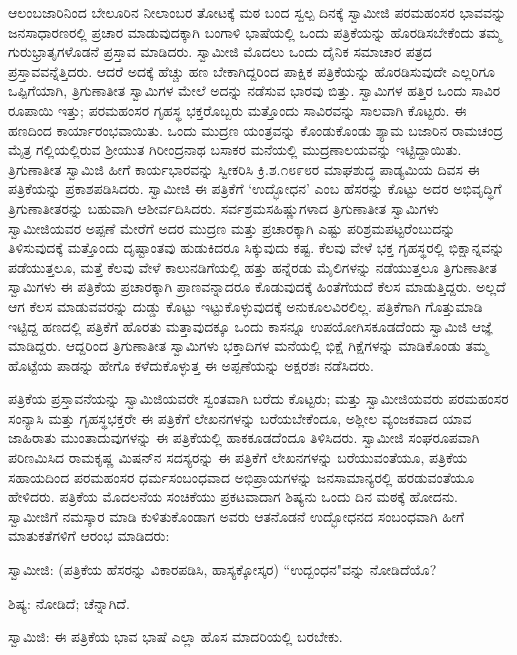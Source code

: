 ಆಲಂಬಜಾರಿನಿಂದ ಬೇಲೂರಿನ ನೀಲಾಂಬರ ತೋಟಕ್ಕೆ ಮಠ ಬಂದ ಸ್ವಲ್ಪ ದಿನಕ್ಕೆ ಸ್ವಾಮೀಜಿ ಪರಮಹಂಸರ ಭಾವವನ್ನು ಜನಸಾಧಾರಣರಲ್ಲಿ ಪ್ರಚಾರ ಮಾಡುವುದಕ್ಕಾಗಿ ಬಂಗಾಳಿ ಭಾಷೆಯಲ್ಲಿ ಒಂದು ಪತ್ರಿಕೆಯನ್ನು ಹೊರಡಿಸಬೇಕೆಂದು ತಮ್ಮ ಗುರುಭ್ರಾತೃಗಳೊಡನೆ ಪ್ರಸ್ತಾವ ಮಾಡಿದರು. ಸ್ವಾಮೀಜಿ ಮೊದಲು ಒಂದು ದೈನಿಕ ಸಮಾಚಾರ ಪತ್ರದ ಪ್ರಸ್ತಾವವನ್ನೆತ್ತಿದರು. ಆದರೆ ಅದಕ್ಕೆ ಹೆಚ್ಚು ಹಣ ಬೇಕಾಗಿದ್ದರಿಂದ ಪಾಕ್ಷಿಕ ಪತ್ರಿಕೆಯನ್ನು ಹೊರಡಿಸುವುದೇ ಎಲ್ಲರಿಗೂ ಒಪ್ಪಿಗೆಯಾಗಿ, ತ್ರಿಗುಣಾತೀತ ಸ್ವಾಮಿಗಳ ಮೇಲೆ ಅದನ್ನು ನಡೆಸುವ ಭಾರವು ಬಿತ್ತು. ಸ್ವಾಮಿಗಳ ಹತ್ತಿರ ಒಂದು ಸಾವಿರ ರೂಪಾಯಿ ಇತ್ತು; ಪರಮಹಂಸರ ಗೃಹಸ್ಥ ಭಕ್ತರೊಬ್ಬರು ಮತ್ತೊಂದು ಸಾವಿರವನ್ನು ಸಾಲವಾಗಿ ಕೊಟ್ಟರು. ಈ ಹಣದಿಂದ ಕಾರ್ಯಾರಂಭವಾಯಿತು. ಒಂದು ಮುದ್ರಣ ಯಂತ್ರವನ್ನು ಕೊಂಡುಕೊಂಡು ಶ್ಯಾಮ ಬಜಾರಿನ ರಾಮಚಂದ್ರ ಮೈತ್ರ ಗಲ್ಲಿಯಲ್ಲಿರುವ ಶ‍್ರೀಯುತ ಗಿರೀಂದ್ರನಾಥ ಬಸಾಕರ ಮನೆಯಲ್ಲಿ ಮುದ್ರಣಾಲಯವನ್ನು ಇಟ್ಟಿದ್ದಾಯಿತು. ತ್ರಿಗುಣಾತೀತ ಸ್ವಾಮಿಜಿ ಹೀಗೆ ಕಾರ್ಯಭಾರವನ್ನು ಸ್ವೀಕರಿಸಿ ಕ್ರಿ.ಶ.೧೮೯೮ರ ಮಾಘಶುದ್ಧ ಪಾಡ್ಯಮಿಯ ದಿವಸ ಈ ಪತ್ರಿಕೆಯನ್ನು ಪ್ರಕಾಶಪಡಿಸಿದರು. ಸ್ವಾಮೀಜಿ ಈ ಪತ್ರಿಕೆಗೆ ‘ಉದ್ಭೋಧನ’ ಎಂಬ ಹೆಸರನ್ನು ಕೊಟ್ಟು ಅದರ ಅಭಿವೃದ್ಧಿಗೆ ತ್ರಿಗುಣಾತೀತರನ್ನು ಬಹುವಾಗಿ ಆಶೀರ್ವದಿಸಿದರು. ಸರ್ವಶ್ರಮಸಹಿಷ್ಣುಗಳಾದ ತ್ರಿಗುಣಾತೀತ ಸ್ವಾಮಿಗಳು ಸ್ವಾಮೀಜಿಯವರ ಅಪ್ಪಣೆ ಮೇರೆಗೆ ಅದರ ಮುದ್ರಣ ಮತ್ತು ಪ್ರಚಾರಕ್ಕಾಗಿ ಎಷ್ಟು ಪರಿಶ್ರಮಪಟ್ಟರೆಂಬುದನ್ನು ತಿಳಿಸುವುದಕ್ಕೆ ಮತ್ತೊಂದು ದೃಷ್ಟಾಂತವು ಹುಡುಕಿದರೂ ಸಿಕ್ಕುವುದು ಕಷ್ಟ. ಕೆಲವು ವೇಳೆ ಭಕ್ತ ಗೃಹಸ್ಥರಲ್ಲಿ ಭಿಕ್ಷಾನ್ನವನ್ನು ಪಡೆಯುತ್ತಲೂ, ಮತ್ತೆ ಕೆಲವು ವೇಳೆ ಕಾಲುನಡಿಗೆಯಲ್ಲಿ ಹತ್ತು ಹನ್ನೆರಡು ಮೈಲಿಗಳನ್ನು ನಡೆಯುತ್ತಲೂ ತ್ರಿಗುಣಾತೀತ ಸ್ವಾಮಿಗಳು ಈ ಪತ್ರಿಕೆಯ ಪ್ರಚಾರಕ್ಕಾಗಿ ಪ್ರಾಣವನ್ನಾದರೂ ಕೊಡುವುದಕ್ಕೆ ಹಿಂತೆಗೆಯದೆ ಕೆಲಸ ಮಾಡುತ್ತಿದ್ದರು. ಅಲ್ಲದೆ ಆಗ ಕೆಲಸ ಮಾಡುವವರನ್ನು ದುಡ್ಡು ಕೊಟ್ಟು ಇಟ್ಟುಕೊಳ್ಳುವುದಕ್ಕೆ ಅನುಕೂಲವಿರಲಿಲ್ಲ. ಪತ್ರಿಕೆಗಾಗಿ ಗೊತ್ತುಮಾಡಿ ಇಟ್ಟಿದ್ದ ಹಣದಲ್ಲಿ ಪತ್ರಿಕೆಗೆ ಹೊರತು ಮತ್ತಾವುದಕ್ಕೂ ಒಂದು ಕಾಸನ್ನೂ ಉಪಯೋಗಿಸಕೂಡದೆಂದು ಸ್ವಾಮಿಜಿ ಆಜ್ಞೆ ಮಾಡಿದ್ದರು. ಆದ್ದರಿಂದ ತ್ರಿಗುಣಾತೀತ ಸ್ವಾಮಿಗಳು ಭಕ್ತಾದಿಗಳ ಮನೆಯಲ್ಲಿ ಭಿಕ್ಷೆ ಗಿಕ್ಷೆಗಳನ್ನು ಮಾಡಿಕೊಂಡು ತಮ್ಮ ಹೊಟ್ಟೆಯ ಪಾಡನ್ನು ಹೇಗೊ ಕಳೆದುಕೊಳ್ಳುತ್ತ ಈ ಅಪ್ಪಣೆಯನ್ನು ಅಕ್ಷರಶಃ ನಡೆಸಿದರು.

ಪತ್ರಿಕೆಯ ಪ್ರಸ್ತಾವನೆಯನ್ನು ಸ್ವಾಮಿಜಿಯವರೇ ಸ್ವಂತವಾಗಿ ಬರೆದು ಕೊಟ್ಟರು; ಮತ್ತು ಸ್ವಾಮೀಜಿಯವರು ಪರಮಹಂಸರ ಸಂನ್ಯಾಸಿ ಮತ್ತು ಗೃಹಸ್ಥಭಕ್ತರೇ ಈ ಪತ್ರಿಕೆಗೆ ಲೇಖನಗಳನ್ನು ಬರೆಯಬೇಕೆಂದೂ, ಅಶ್ಲೀಲ ವ್ಯಂಜಕವಾದ ಯಾವ ಜಾಹಿರಾತು ಮುಂತಾದುವುಗಳನ್ನು ಈ ಪತ್ರಿಕೆಯಲ್ಲಿ ಹಾಕಕೂಡದೆಂದೂ ತಿಳಿಸಿದರು. ಸ್ವಾಮೀಜಿ ಸಂಘರೂಪವಾಗಿ ಪರಿಣಮಿಸಿದ ರಾಮಕೃಷ್ಣ ಮಿಷನ್‌ನ ಸದಸ್ಯರನ್ನು ಈ ಪತ್ರಿಕೆಗೆ ಲೇಖನಗಳನ್ನು ಬರೆಯುವಂತೆಯೂ, ಪತ್ರಿಕೆಯ ಸಹಾಯದಿಂದ ಪರಮಹಂಸರ ಧರ್ಮಸಂಬಂಧವಾದ ಅಭಿಪ್ರಾಯಗಳನ್ನು ಜನಸಾಮಾನ್ಯರಲ್ಲಿ ಹರಡುವಂತೆಯೂ ಹೇಳಿದರು. ಪತ್ರಿಕೆಯ ಮೊದಲನೆಯ ಸಂಚಿಕೆಯು ಪ್ರಕಟವಾದಾಗ ಶಿಷ್ಯನು ಒಂದು ದಿನ ಮಠಕ್ಕೆ ಹೋದನು. ಸ್ವಾಮೀಜಿಗೆ ನಮಸ್ಕಾರ ಮಾಡಿ ಕುಳಿತುಕೊಂಡಾಗ ಅವರು ಆತನೊಡನೆ ಉದ್ಭೋಧನದ ಸಂಬಂಧವಾಗಿ ಹೀಗೆ ಮಾತುಕತೆಗಳಿಗೆ ಆರಂಭ ಮಾಡಿದರು:

ಸ್ವಾಮೀಜಿ: (ಪತ್ರಿಕೆಯ ಹೆಸರನ್ನು ವಿಕಾರಪಡಿಸಿ, ಹಾಸ್ಯಕ್ಕೋಸ್ಕರ) “ಉದ್ಬಂಧನ"ವನ್ನು ನೋಡಿದೆಯೊ?

ಶಿಷ್ಯ: ನೋಡಿದೆ; ಚೆನ್ನಾಗಿದೆ.

ಸ್ವಾಮಿಜಿ: ಈ ಪತ್ರಿಕೆಯ ಭಾವ ಭಾಷೆ ಎಲ್ಲಾ ಹೊಸ ಮಾದರಿಯಲ್ಲಿ ಬರಬೇಕು.

